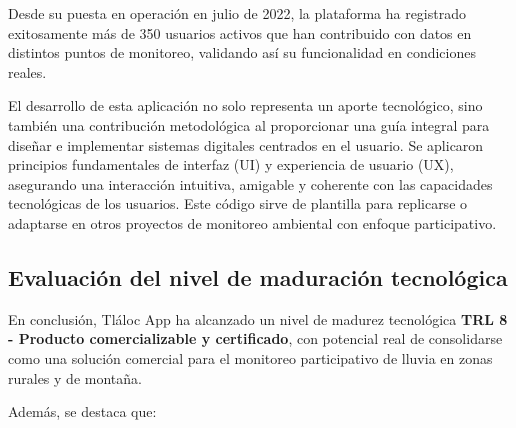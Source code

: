 Desde su puesta en operación en julio de 2022, la plataforma ha registrado exitosamente más de 350 usuarios activos que han contribuido con datos en distintos puntos de monitoreo, validando así su funcionalidad en condiciones reales. 

El desarrollo de esta aplicación no solo representa un aporte tecnológico, sino también una contribución metodológica al proporcionar una guía integral para diseñar e implementar sistemas digitales centrados en el usuario. Se aplicaron principios fundamentales de interfaz (UI) y experiencia de usuario (UX), asegurando una interacción intuitiva, amigable y coherente con las capacidades tecnológicas de los usuarios. Este código sirve de plantilla para replicarse o adaptarse en otros proyectos de monitoreo ambiental con enfoque participativo.


\subsection{Evaluación del nivel de maduración tecnológica}

En conclusión, Tláloc App ha alcanzado un nivel de madurez tecnológica \textbf{TRL 8 - Producto comercializable y certificado}, con potencial real de consolidarse como una solución comercial para el monitoreo participativo de lluvia en zonas rurales y de montaña.

Además, se destaca que:


